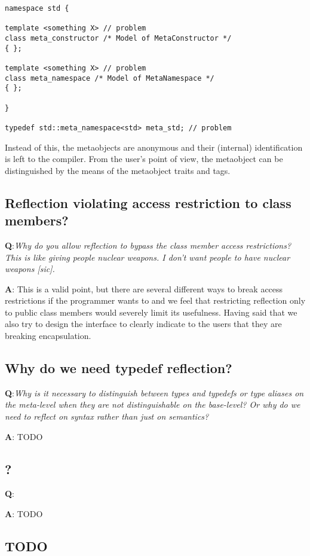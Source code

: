 \begin{verbatim}
namespace std {

template <something X> // problem
class meta_constructor /* Model of MetaConstructor */
{ };

template <something X> // problem
class meta_namespace /* Model of MetaNamespace */
{ };

}

typedef std::meta_namespace<std> meta_std; // problem
\end{verbatim}

Instead of this, the metaobjects are anonymous and their (internal) identification
is left to the compiler. From the user's point of view, the metaobject can be distinguished
by the means of the metaobject traits and tags.

\subsection{Reflection violating access restriction to class members?}

{\textbf Q:}{\em Why do you allow reflection to bypass the class member access
restrictions? This is like giving people nuclear weapons. I don't want people
to have nuclear weapons [sic].}

{\textbf A:}
This is a valid point, but there are several different ways to break access restrictions
if the programmer wants to and we feel that restricting reflection only to public
class members would severely limit its usefulness. Having said that we also
try to design the interface to clearly indicate to the users that they are breaking
encapsulation.

\subsection{Why do we need typedef reflection?}

{\textbf Q:}{\em Why is it necessary to distinguish between types and typedefs
or type aliases on the meta-level when they are not distinguishable on the
base-level? Or why do we need to reflect on syntax rather than just on semantics?}

{\textbf A:}
TODO

\subsection{?}

{\textbf Q:}{\em } 

{\textbf A:}
TODO

\subsection{TODO}
